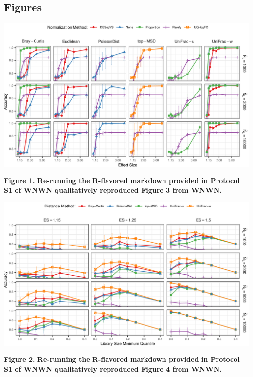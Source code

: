 \documentclass[
]{article}
\begin{document}
\newpage

\hypertarget{figures}{%
\subsection{Figures}\label{figures}}

\includegraphics{figure_01.png}

\textbf{Figure 1. Re-running the R-flavored markdown provided in
Protocol S1 of WNWN qualitatively reproduced Figure 3 from WNWN.}

\newpage

\includegraphics{figure_02.png}

\textbf{Figure 2. Re-running the R-flavored markdown provided in
Protocol S1 of WNWN qualitatively reproduced Figure 4 from WNWN.}

\newpage
\end{document}
